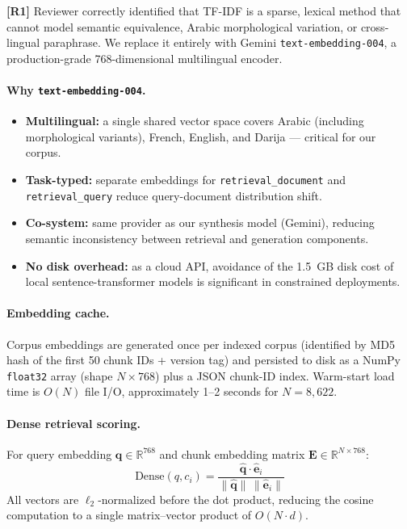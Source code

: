 \documentclass[12pt,a4paper]{article}
\newcommand{\response}[2]{%
  \vspace{4pt}
  \noindent\colorbox{yellow!20}{\parbox{\dimexpr\linewidth-2\fboxsep}{%
    \small\textbf{\color{revcolor}[R#1]} #2}}\vspace{4pt}}
\begin{document}
\response{1}{Reviewer correctly identified that TF-IDF is a sparse, lexical
method that cannot model semantic equivalence, Arabic morphological variation,
or cross-lingual paraphrase. We replace it entirely with Gemini
\texttt{text-embedding-004}, a production-grade 768-dimensional multilingual
encoder.}

\paragraph{Why \texttt{text-embedding-004}.}
\begin{itemize}[leftmargin=*,nosep]
\item \textbf{Multilingual:} a single shared vector space covers Arabic (including morphological variants), French, English, and Darija — critical for our corpus.
\item \textbf{Task-typed:} separate embeddings for \texttt{retrieval\_document} and \texttt{retrieval\_query} reduce query-document distribution shift.
\item \textbf{Co-system:} same provider as our synthesis model (Gemini), reducing semantic inconsistency between retrieval and generation components.
\item \textbf{No disk overhead:} as a cloud API, avoidance of the 1.5~GB disk cost of local sentence-transformer models is significant in constrained deployments.
\end{itemize}

\paragraph{Embedding cache.} Corpus embeddings are generated once per indexed
corpus (identified by MD5 hash of the first 50 chunk IDs + version tag) and
persisted to disk as a NumPy \texttt{float32} array (shape $N \times 768$) plus
a JSON chunk-ID index. Warm-start load time is $O(N)$ file I/O, approximately
1--2 seconds for $N = 8{,}622$.

\paragraph{Dense retrieval scoring.} For query embedding $\mathbf{q} \in \mathbb{R}^{768}$
and chunk embedding matrix $\mathbf{E} \in \mathbb{R}^{N \times 768}$:
\begin{equation}
\text{Dense}(q, c_i) = \frac{\hat{\mathbf{q}} \cdot \hat{\mathbf{e}}_i}{\|\hat{\mathbf{q}}\|\,\|\hat{\mathbf{e}}_i\|}
\label{eq:dense}
\end{equation}
All vectors are $\ell_2$-normalized before the dot product, reducing the cosine
computation to a single matrix–vector product of $O(N \cdot d)$.
\end{document}
